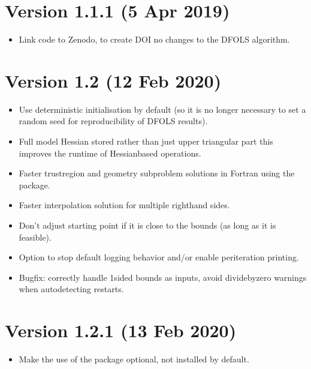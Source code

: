 \documentclass[letterpaper,10pt,english]{sphinxmanual}
\begin{document}
\section{Version 1.1.1 (5 Apr 2019)}
\label{\detokenize{history:version-1-1-1-5-apr-2019}}\begin{itemize}
\item {} 
Link code to Zenodo, to create DOI \sphinxhyphen{} no changes to the DFO\sphinxhyphen{}LS algorithm.

\end{itemize}


\section{Version 1.2 (12 Feb 2020)}
\label{\detokenize{history:version-1-2-12-feb-2020}}\begin{itemize}
\item {} 
Use deterministic initialisation by default (so it is no longer necessary to set a random seed for reproducibility of DFO\sphinxhyphen{}LS results).

\item {} 
Full model Hessian stored rather than just upper triangular part \sphinxhyphen{} this improves the runtime of Hessian\sphinxhyphen{}based operations.

\item {} 
Faster trust\sphinxhyphen{}region and geometry subproblem solutions in Fortran using the  package.

\item {} 
Faster interpolation solution for multiple right\sphinxhyphen{}hand sides.

\item {} 
Don’t adjust starting point if it is close to the bounds (as long as it is feasible).

\item {} 
Option to stop default logging behavior and/or enable per\sphinxhyphen{}iteration printing.

\item {} 
Bugfix: correctly handle 1\sphinxhyphen{}sided bounds as inputs, avoid divide\sphinxhyphen{}by\sphinxhyphen{}zero warnings when auto\sphinxhyphen{}detecting restarts.

\end{itemize}


\section{Version 1.2.1 (13 Feb 2020)}
\label{\detokenize{history:version-1-2-1-13-feb-2020}}\begin{itemize}
\item {} 
Make the use of the  package optional, not installed by default.

\end{itemize}
\end{document}
